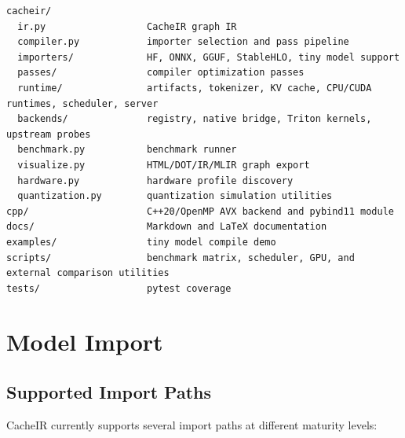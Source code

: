\documentclass[11pt]{article}
\begin{document}
\begin{lstlisting}
cacheir/
  ir.py                  CacheIR graph IR
  compiler.py            importer selection and pass pipeline
  importers/             HF, ONNX, GGUF, StableHLO, tiny model support
  passes/                compiler optimization passes
  runtime/               artifacts, tokenizer, KV cache, CPU/CUDA runtimes, scheduler, server
  backends/              registry, native bridge, Triton kernels, upstream probes
  benchmark.py           benchmark runner
  visualize.py           HTML/DOT/IR/MLIR graph export
  hardware.py            hardware profile discovery
  quantization.py        quantization simulation utilities
cpp/                     C++20/OpenMP AVX backend and pybind11 module
docs/                    Markdown and LaTeX documentation
examples/                tiny model compile demo
scripts/                 benchmark matrix, scheduler, GPU, and external comparison utilities
tests/                   pytest coverage
\end{lstlisting}

\section{Model Import}

\subsection{Supported Import Paths}

CacheIR currently supports several import paths at different maturity levels:
\end{document}
